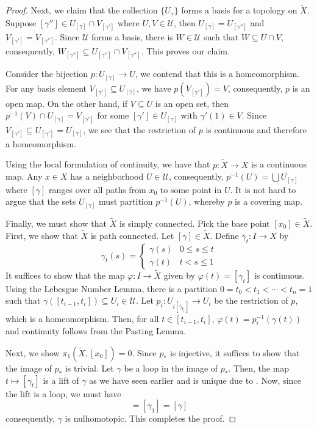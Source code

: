 \begin{proof}
Next, we claim that the collection $\{U_{\gamma}\}$ forms a basis for a topology on $\widetilde X$. Suppose $[\gamma'']\in U_{[\gamma]}\cap V_{[\gamma']}$ where $U,V\in\mathscr U$, then $U_{[\gamma]} = U_{[\gamma'']}$ and $V_{[\gamma']} = V_{[\gamma'']}$. Since $\mathscr U$ forms a basis, there is $W\in\mathscr U$ such that $W\subseteq U\cap V$, consequently, $W_{[\gamma'']}\subseteq U_{[\gamma'']}\cap V_{[\gamma'']}$. This proves our claim.

Consider the bijection $p: U_{[\gamma]}\to U$, we contend that this is a homeomorphism. For any basis element $V_{[\gamma']}\subseteq U_{[\gamma]}$, we have $p(V_{[\gamma']}) = V$, consequently, $p$ is an open map. On the other hand, if $V\subseteq U$ is an open set, then $p^{-1}(V)\cap U_{[\gamma]} = V_{[\gamma']}$ for some $[\gamma']\in U_{[\gamma]}$ with $\gamma'(1)\in V$. Since $V_{[\gamma']}\subseteq U_{[\gamma']} = U_{[\gamma]}$, we see that the restriction of $p$ is continuous and therefore a homeomorphism.

Using the local formulation of continuity, we have that $p:\widetilde X\to X$ is a continuous map. Any $x\in X$ has a neighborhood $U\in\mathscr U$, consequently, $p^{-1}(U) = \bigcup U_{[\gamma]}$ where $[\gamma]$ ranges over all paths from $x_0$ to some point in $U$. It is not hard to argue that the sets $U_{[\gamma]}$ must partition $p^{-1}(U)$, whereby $p$ is a covering map.

Finally, we must show that $\widetilde X$ is simply connected. Pick the base point $[x_0]\in\widetilde{X}$. First, we show that $\widetilde X$ is path connected. Let $[\gamma]\in\widetilde X$. Define $\gamma_t: I\to X$ by 
\begin{equation*}
    \gamma_t(s) = 
    \begin{cases}
        \gamma(s) & 0\le s\le t\\
        \gamma(t) & t < s \le 1
    \end{cases}
\end{equation*}
It suffices to show that the map $\varphi: I\to\widetilde X$ given by $\varphi(t) = [\gamma_t]$ is continuous. Using the Lebesgue Number Lemma, there is a partition $0 = t_0 < t_1 < \cdots < t_n = 1$ such that $\gamma([t_{i - 1}, t_i])\subseteq U_i\in\mathscr U$. Let $p_i: U_{i[\gamma_{t_i}]}\to U_i$ be the restriction of $p$, which is a homeomorphism. Then, for all $t\in[t_{i - 1}, t_i]$, $\varphi(t) = p_i^{-1}(\gamma(t))$ and continuity follows from the Pasting Lemma.

Next, we show $\pi_1(\widetilde X,[x_0]) = 0$. Since $p_*$ is injective, it suffices to show that the image of $p_*$ is trivial. Let $\gamma$ be a loop in the image of $p_*$. Then, the map $t\mapsto[\gamma_t]$ is a lift of $\gamma$ as we have seen earlier and is unique due to . Now, since the lift is a loop, we must have 
\begin{equation*}
    [x_0] = [\gamma_1] = [\gamma]
\end{equation*}
consequently, $\gamma$ is nulhomotopic. This completes the proof.
\end{proof}

